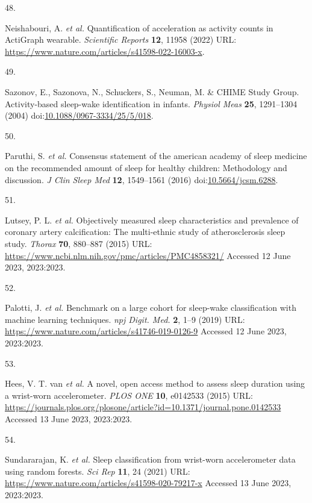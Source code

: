 \documentclass[
  9pt,
]{scrbook}
\newlength{\cslhangindent}
\newlength{\csllabelwidth}
\newlength{\cslentryspacingunit} %
\newenvironment{CSLReferences}[2] %
 {%
  \setlength{\parindent}{0pt}
  \ifodd #1
  \let\oldpar\par
  \def\par{\hangindent=\cslhangindent\oldpar}
  \fi
  \setlength{\parskip}{#2\cslentryspacingunit}
 }%
 {}
\newcommand{\CSLLeftMargin}[1]{\parbox[t]{\csllabelwidth}{#1}}
\newcommand{\CSLRightInline}[1]{\parbox[t]{\linewidth - \csllabelwidth}{#1}\break}
\begin{document}
\begin{CSLReferences}{0}{0}
\leavevmode{}%
\CSLLeftMargin{48. }%
\CSLRightInline{Neishabouri, A. \emph{et al.} Quantification of
acceleration as activity counts in ActiGraph wearable. \emph{Scientific
Reports} \textbf{12}, 11958 (2022) URL:
\url{https://www.nature.com/articles/s41598-022-16003-x}.}

\leavevmode{}%
\CSLLeftMargin{49. }%
\CSLRightInline{Sazonov, E., Sazonova, N., Schuckers, S., Neuman, M. \&
CHIME Study Group. Activity-based sleep-wake identification in infants.
\emph{Physiol Meas} \textbf{25}, 1291--1304 (2004)
doi:\href{https://doi.org/10.1088/0967-3334/25/5/018}{10.1088/0967-3334/25/5/018}.}

\leavevmode{}%
\CSLLeftMargin{50. }%
\CSLRightInline{Paruthi, S. \emph{et al.} Consensus statement of the
american academy of sleep medicine on the recommended amount of sleep
for healthy children: Methodology and discussion. \emph{J Clin Sleep
Med} \textbf{12}, 1549--1561 (2016)
doi:\href{https://doi.org/10.5664/jcsm.6288}{10.5664/jcsm.6288}.}

\leavevmode{}%
\CSLLeftMargin{51. }%
\CSLRightInline{Lutsey, P. L. \emph{et al.} Objectively measured sleep
characteristics and prevalence of coronary artery calcification: The
multi-ethnic study of atherosclerosis sleep study. \emph{Thorax}
\textbf{70}, 880--887 (2015) URL:
\url{https://www.ncbi.nlm.nih.gov/pmc/articles/PMC4858321/} Accessed 12
June 2023, 2023:2023.}

\leavevmode{}%
\CSLLeftMargin{52. }%
\CSLRightInline{Palotti, J. \emph{et al.} Benchmark on a large cohort
for sleep-wake classification with machine learning techniques.
\emph{npj Digit. Med.} \textbf{2}, 1--9 (2019) URL:
\url{https://www.nature.com/articles/s41746-019-0126-9} Accessed 12 June
2023, 2023:2023.}

\leavevmode{}%
\CSLLeftMargin{53. }%
\CSLRightInline{Hees, V. T. van \emph{et al.} A novel, open access
method to assess sleep duration using a wrist-worn accelerometer.
\emph{{PLOS} {ONE}} \textbf{10}, e0142533 (2015) URL:
\url{https://journals.plos.org/plosone/article?id=10.1371/journal.pone.0142533}
Accessed 13 June 2023, 2023:2023.}

\leavevmode{}%
\CSLLeftMargin{54. }%
\CSLRightInline{Sundararajan, K. \emph{et al.} Sleep classification from
wrist-worn accelerometer data using random forests. \emph{Sci Rep}
\textbf{11}, 24 (2021) URL:
\url{https://www.nature.com/articles/s41598-020-79217-x} Accessed 13
June 2023, 2023:2023.}


\end{CSLReferences}
\end{document}
